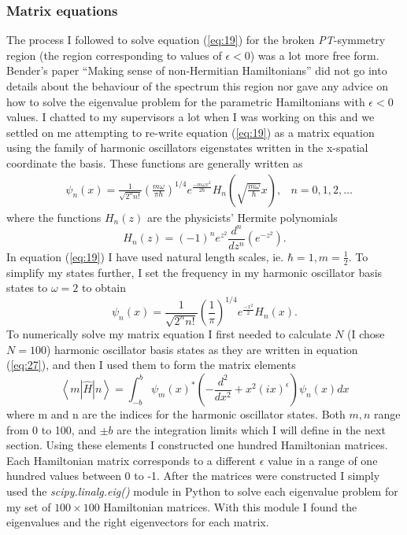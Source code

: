 \documentclass[10pt, a4paper, singlespacing, headsepline]{article}
\newcommand\PT{\textit{PT}}
\begin{document}
\subsubsection{Matrix equations}
The process I followed to solve equation (\ref{eq:19}) for the broken \PT-symmetry region (the region corresponding to values of $\epsilon < 0$) was a lot more free form. Bender's paper ``Making sense of non-Hermitian Hamiltonians'' did not go into details about the behaviour of the spectrum this region nor gave any advice on how to solve the eigenvalue problem for the parametric Hamiltonians with $\epsilon < 0$ values. I chatted to my supervisors a lot when I was working on this and we settled on me attempting to re-write equation (\ref{eq:19}) as a matrix equation using the family of harmonic oscillators eigenstates written in the x-spatial coordinate the basis. These functions are generally written as
\begin{align} \label{eq:25}
&\psi_n(x)= \frac{1}{\sqrt{2^n n!}} 
\left ( \frac{m \omega}{\pi \hbar}\right )^{1/4} e^{\frac{-m \omega x^2}{2 \hbar}}
H_n \left (\sqrt{\frac{m \omega}{\hbar}}x\right ),  &n = 0, 1, 2, \dots
\end{align}
where the functions $H_n(z)$ are the physicists' Hermite polynomials
\begin{equation} \label{eq:26}
H_n(z) = (-1)^n e^{z^2} \frac{d^n}{dz^n}\left( e^{-z^2}\right).
\end{equation}
In equation (\ref{eq:19}) I have used natural length scales, ie. $\hbar = 1, m = \frac{1}{2}$. To simplify my states further, I set the frequency in my harmonic oscillator basis states to $\omega = 2$ to obtain
\begin{equation} \label{eq:27}
\psi_n(x)= \frac{1}{\sqrt{2^n n!}} 
\left ( \frac{1}{\pi}\right )^{1/4} e^{\frac{-x^2}{2}}
H_n (x).
\end{equation}
To numerically solve my matrix equation I first needed to calculate $N$ (I chose $N = 100$) harmonic oscillator basis states as they are written in equation (\ref{eq:27}), and then I used them to form the matrix elements 
\begin{equation}\label{eq:28}
\left \langle m \left |\hat{H} \right|n \right \rangle = \int_{-b}^{b} \psi_m(x)^* \left (  - \frac{d^2}{dx^2} + x^2(ix)^{\epsilon}\right ) \psi_n(x) dx
\end{equation}
where m and n are the indices for the harmonic oscillator states. Both $m, n$ range from 0 to 100, and $\pm b$ are the integration limits which I will define in the next section. Using these elements I constructed one hundred Hamiltonian matrices. Each Hamiltonian matrix corresponds to a different $\epsilon$ value in a range of one hundred values between 0 to -1. 
After the matrices were constructed I simply used the \textit{scipy.linalg.eig()} module in Python to solve each eigenvalue problem for my set of $100\times100$ Hamiltonian matrices. With this module I found the eigenvalues and the right eigenvectors for each matrix.
\end{document}

